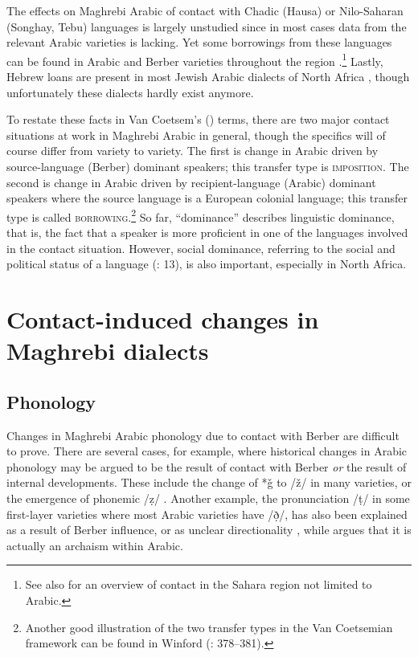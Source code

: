 \documentclass[output=paper]{langsci/langscibook}
\begin{document}
  The effects on Maghrebi Arabic of contact with Chadic (Hausa) or Nilo-Saharan (Songhay, Tebu) languages is largely unstudied since in most cases data from the relevant Arabic varieties is lacking. Yet some borrowings from these languages can be found in Arabic and Berber varieties throughout the region \citep{Souag2013lexical}.\footnote{See also \citet{Souag2016sahara} for an overview of contact in the Sahara region not limited to Arabic.} Lastly, Hebrew loans are present in most Jewish Arabic dialects of North Africa \citep{Yoda2013}, though unfortunately these dialects hardly exist anymore.

  To restate these facts in Van Coetsem’s (\citeyear{VanCoetsem1988,VanCoetsem2000}) terms, there are two major contact situations at work in Maghrebi Arabic in general, though the specifics will of course differ from variety to variety. The first is change in Arabic driven by source-language (Berber) dominant speakers; this transfer type is \textsc{imposition}. The second is change in Arabic driven by recipient-language (Arabic) dominant speakers where the source language is a European colonial language; this transfer type is called \textsc{borrowing}.\footnote{Another good illustration of the two transfer types in the Van Coetsemian framework can be found in Winford (\citeyear{Winford2005}: 378–381).} So far, ``dominance'' describes linguistic dominance, that is, the fact that a speaker is more proficient in one of the languages involved in the contact situation. However, social dominance, referring to the social and political status of a language (\citealt{VanCoetsem1988}: 13), is also important, especially in North Africa.

\section{ Contact-induced changes in Maghrebi dialects}

\subsection{ Phonology}

Changes in Maghrebi Arabic phonology due to contact with Berber are difficult to prove. There are several cases, for example, where historical changes in Arabic phonology may be argued to be the result of contact with Berber \textit{or} the result of internal developments. These include the change of *ǧ to /ž/ in many varieties, or the emergence of phonemic /ẓ/ \citep{Souag2016sahara}. Another example, the pronunciation /ṭ/ in some first-layer varieties where most Arabic varieties have /ð̣/, has also been explained as a result of Berber influence, or as unclear directionality \citep[187]{Kossmann2013book}, while \citet{Al-Jallad2015Maghreb} argues that it is actually an archaism within Arabic.
\end{document}
